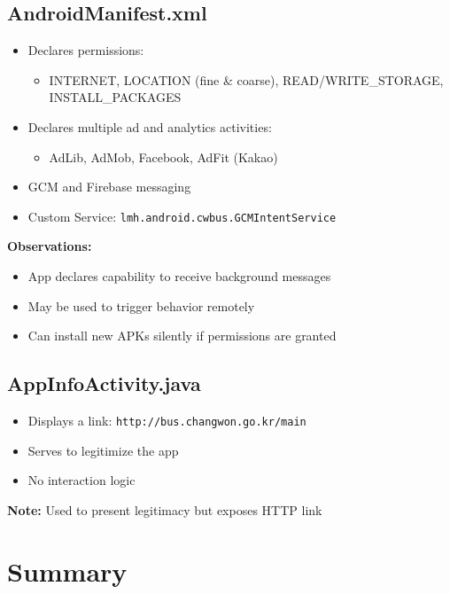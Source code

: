 \subsection{AndroidManifest.xml}
\begin{itemize}
  \item Declares permissions:
    \begin{itemize}
      \item INTERNET, LOCATION (fine \& coarse), READ/WRITE\_STORAGE, INSTALL\_PACKAGES
    \end{itemize}
  \item Declares multiple ad and analytics activities:
    \begin{itemize}
      \item AdLib, AdMob, Facebook, AdFit (Kakao)
    \end{itemize}
  \item GCM and Firebase messaging
  \item Custom Service: \texttt{lmh.android.cwbus.GCMIntentService}
\end{itemize}
\textbf{Observations:}
\begin{itemize}
  \item App declares capability to receive background messages
  \item May be used to trigger behavior remotely
  \item Can install new APKs silently if permissions are granted
\end{itemize}

\subsection{AppInfoActivity.java}
\begin{itemize}
  \item Displays a link: \texttt{http://bus.changwon.go.kr/main}
  \item Serves to legitimize the app
  \item No interaction logic
\end{itemize}
\textbf{Note:} Used to present legitimacy but exposes HTTP link

\section{Summary}

